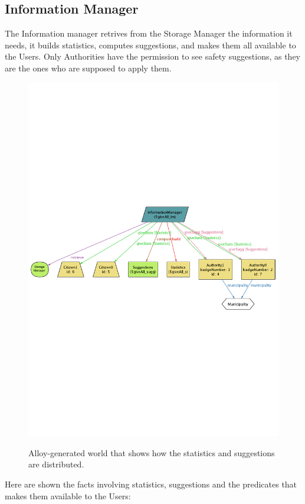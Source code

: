 \documentclass{report}
\begin{document}
\subsection{Information Manager}
The Information manager retrives from the Storage Manager the information it needs, it builds statistics, computes suggestions, and makes them all available to the Users. Only Authorities have the permission to see safety suggestions, as they are the ones who are supposed to apply them.\vfill
\begin{figure}[ht!]
	\begin{center}
	\includegraphics[width=.8\textwidth]{./img/giveAll.pdf}
	\label{fig:allgive}
	\caption{Alloy-generated world that shows how the statistics and suggestions are distributed.}
	\end{center}
\end{figure}
\noindent Here are shown the facts involving statistics, suggestions and the predicates that makes them available to the Users:
\end{document}
